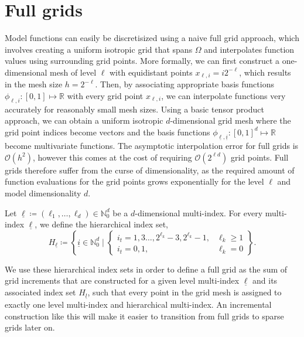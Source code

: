 \documentclass[
  a4paper,  %
  twoside,  %
  bibliography=totoc,
  headsepline,
  cleardoublepage=empty,
  parskip=half,
  draft=false
]{scrbook}
\begin{document}
\section{Full grids}

Model functions can easily be discretisized using a naive full grid approach, which involves creating a uniform isotropic grid that spans $\Omega$ and interpolates function values using surrounding grid points.
More formally, we can first construct a one-dimensional mesh of level $\ell$ with equidistant points $x_{\ell,i}=i2^{-\ell}$, which results in the mesh size $h=2^{-\ell}$.
Then, by associating appropriate basis functions $\phi_{\ell,i} \colon [0,1] \mapsto \mathds{R}$ with every grid point $x_{\ell,i}$, we can interpolate functions very accurately for reasonably small mesh sizes.
Using a basic tensor product approach, we can obtain a uniform isotropic $d$-dimensional grid mesh where the grid point indices become vectors and the basis functions $\phi_{\underline{\ell},\underline{i}} \colon [0,1]^d \mapsto \mathds{R}$ become multivariate functions.
The asymptotic interpolation error for full grids is $\mathcal{O}(h^2)$, however this comes at the cost of requiring $\mathcal{O}(2^{\ell d})$ grid points.
Full grids therefore suffer from the curse of dimensionality, as the required amount of function evaluations for the grid points grows exponentially for the level $\ell$ and model dimensionality $d$.

\begin{definition}
Let $\underline{\ell} \coloneqq (\ell_1, \dots, \ell_d) \in \mathds{N}_0^d$ be a $d$-dimensional multi-index.
For every multi-index $\underline{\ell}$, we define the hierarchical index set,
\begin{equation}
H_{\underline{\ell}} \coloneqq \left\{ \underline{i} \in \mathds{N}^d_0 \mid
\begin{cases}
    i_t=1,3\dots,2^{\ell_k} - 3, 2^{\ell_k} - 1, & \ell_k \geq 1 \\
    i_t=0,1, & \ell_k = 0
\end{cases} \right\}.
\end{equation}
\end{definition}
%
We use these hierarchical index sets in order to define a full grid as the sum of grid increments that are constructed for a given level multi-index $\underline{\ell}$ and its associated index set $H_{\underline{l}}$, such that every point in the grid mesh is assigned to exactly one level multi-index and hierarchical multi-index.
An incremental construction like this will make it easier to transition from full grids to sparse grids later on.
\end{document}

